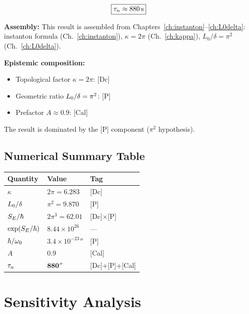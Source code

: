 \begin{resultbox}[title=Metastable Lifetime Prediction]
    \begin{equation}
        \boxed{\tau_n \approx 880\,\mathrm{s}}
        \label{eq:tau_result}
    \end{equation}

    \textbf{Assembly:} This result is assembled from Chapters~\ref{ch:instanton}--\ref{ch:L0delta}:
    instanton formula (Ch.~\ref{ch:instanton}), $\kappa = 2\pi$ (Ch.~\ref{ch:kappa}),
    $L_0/\delta = \pi^2$ (Ch.~\ref{ch:L0delta}).

    \textbf{Epistemic composition:}
    \begin{itemize}
        \item Topological factor $\kappa = 2\pi$: [Dc]
        \item Geometric ratio $L_0/\delta = \pi^2$: [P]
        \item Prefactor $A \approx 0.9$: [Cal]
    \end{itemize}

    The result is dominated by the [P] component ($\pi^2$ hypothesis).
\end{resultbox}

\subsection{Numerical Summary Table}

\begin{center}
\begin{tabular}{lll}
\toprule
\textbf{Quantity} & \textbf{Value} & \textbf{Tag} \\
\midrule
$\kappa$ & $2\pi = 6.283$ & [Dc] \\
$L_0/\delta$ & $\pi^2 = 9.870$ & [P] \\
$S_E/\hbar$ & $2\pi^3 = 62.01$ & [Dc]$\times$[P] \\
$\exp(S_E/\hbar)$ & $8.44 \times 10^{26}$ & — \\
$\hbar/\omega_0$ & $3.4 \times 10^{-23}\second$ & [P] \\
$A$ & $0.9$ & [Cal] \\
\midrule
$\tau_n$ & $\mathbf{880\second}$ & [Dc]+[P]+[Cal] \\
\bottomrule
\end{tabular}
\end{center}

\section{Sensitivity Analysis}
\label{sec:taun:sensitivity}

